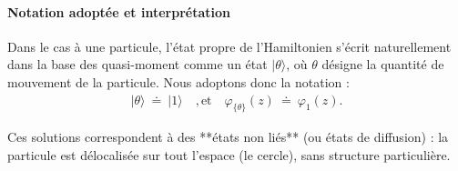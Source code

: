 \paragraph{Notation adoptée et interprétation}

Dans le cas à une particule, l’état propre de l’Hamiltonien s’écrit naturellement dans la base des quasi-moment comme un état \(\vert \theta \rangle\), où \(\theta\) désigne la quantité de mouvement de la particule.  
Nous adoptons donc la notation :
\begin{eqnarray}
	\vert \theta \rangle ~ \doteq ~  \vert 1 \rangle \quad, \mbox{et} \quad  \varphi_{\{\theta\}}(z) ~ \doteq ~ \varphi_1(z).
\end{eqnarray}

Ces solutions correspondent à des **états non liés** (ou états de diffusion) : la particule est délocalisée sur tout l’espace (le cercle), sans structure particulière.





